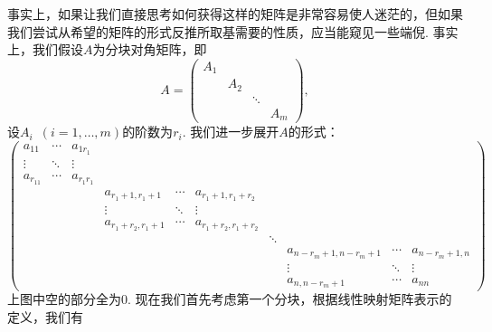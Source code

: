 事实上，如果让我们直接思考如何获得这样的矩阵是非常容易使人迷茫的，但如果我们尝试从希望的矩阵的形式反推所取基需要的性质，应当能窥见一些端倪. 事实上，我们假设$A$为分块对角矩阵，即
\[A=\begin{pmatrix}
        A_1 &     &        &     \\
            & A_2 &        &     \\
            &     & \ddots &     \\
            &     &        & A_m
    \end{pmatrix},\]
设$A_i\enspace(i=1,\ldots,m)$的阶数为$r_i$. 我们进一步展开$A$的形式：
\[\begin{pmatrix}
        a_{11}   & \cdots & a_{1r_1}   &                   &        &                     &        &                     &        &               \\
        \vdots   & \ddots & \vdots     &                   &        &                     &        &                     &        &               \\
        a_{r_11} & \cdots & a_{r_1r_1} &                   &        &                     &        &                     &        &               \\
                 &        &            & a_{r_1+1,r_1+1}   & \cdots & a_{r_1+1,r_1+r_2}   &        &                     &        &               \\
                 &        &            & \vdots            & \ddots & \vdots              &        &                     &        &               \\
                 &        &            & a_{r_1+r_2,r_1+1} & \cdots & a_{r_1+r_2,r_1+r_2} &        &                     &        &               \\
                 &        &            &                   &        &                     & \ddots &                     &        &               \\
                 &        &            &                   &        &                     &        & a_{n-r_m+1,n-r_m+1} & \cdots & a_{n-r_m+1,n} \\
                 &        &            &                   &        &                     &        & \vdots              & \ddots & \vdots        \\
                 &        &            &                   &        &                     &        & a_{n,n-r_m+1}       & \cdots & a_{nn}
    \end{pmatrix}\]
上图中空的部分全为$0$. 现在我们首先考虑第一个分块，根据线性映射矩阵表示的定义，我们有
